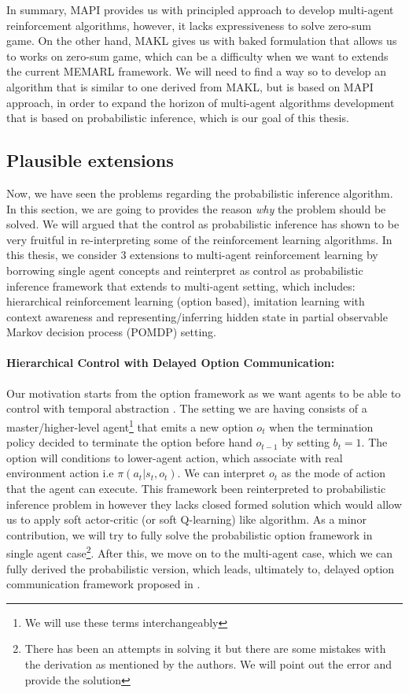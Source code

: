 In summary, MAPI provides us with principled approach to develop multi-agent reinforcement algorithms, however, it lacks expressiveness to solve zero-sum game. On the other hand, MAKL gives us with baked formulation that allows us to works on zero-sum game, which can be a difficulty when we want to extends the current MEMARL framework. We will need to find a way so to develop an algorithm that is similar to one derived from MAKL, but is based on MAPI approach, in order to expand the horizon of multi-agent algorithms development that is based on probabilistic inference, which is our goal of this thesis.

\subsection{Plausible extensions}
\label{sec:chap1-MEMARL-Extensions}
Now, we have seen the problems regarding the probabilistic inference algorithm. In this section, we are going to provides the reason \textit{why} the problem should be solved. We will argued that the control as probabilistic inference has shown to be very fruitful in re-interpreting some of the reinforcement learning algorithms. In this thesis, we consider 3 extensions to multi-agent reinforcement learning by borrowing single agent concepts and reinterpret as control as probabilistic inference framework that extends to multi-agent setting, which includes: hierarchical reinforcement learning (option based), imitation learning with context awareness and representing/inferring hidden state in partial observable Markov decision process (POMDP) setting. 

\paragraph{Hierarchical Control with Delayed Option Communication:} 
Our motivation starts from the option framework as we want agents to be able to control with temporal abstraction \cite{sutton1999between, bacon2017option}. The setting we are having consists of a master/higher-level agent\footnote{We will use these terms interchangeably} that emits a new option $o_t$ when the termination policy decided to terminate the option before hand $o_{t-1}$ by setting $b_t = 1$. The option will conditions to lower-agent action, which associate with real environment action i.e $\pi(a_t | s_t, o_t)$. We can interpret $o_t$ as the mode of action that the agent can execute. This framework been reinterpreted to probabilistic inference problem in \cite{igl2019multitask} however they lacks closed formed solution which would allow us to apply soft actor-critic (or soft Q-learning) like algorithm. As a minor contribution, we will try to fully solve the probabilistic option framework in single agent case\footnote{There has been an attempts in solving it \cite{lobo2019soft} but there are some mistakes with the derivation as mentioned by the authors. We will point out the error and provide the solution}. After this, we move on to the multi-agent case, which we can fully derived the probabilistic version, which leads, ultimately to, delayed option communication framework proposed in \cite{han2019multi}. 


